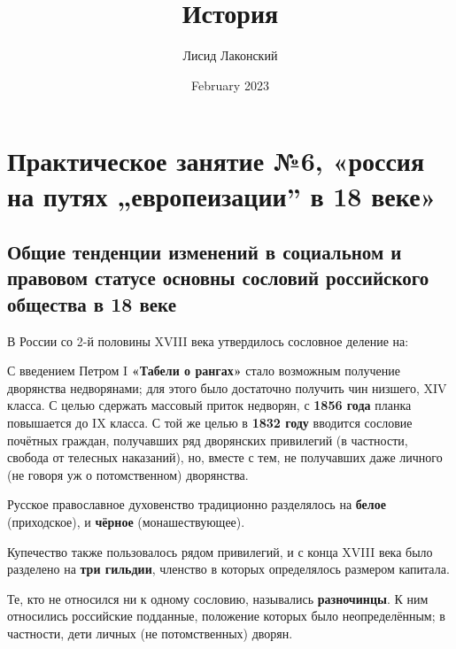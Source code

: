\documentclass{article}
\title{История}
\author{Лисид Лаконский}
\date{February 2023}
\begin{document}
\raggedright

\maketitle
\tableofcontents
\pagebreak

\section{Практическое занятие №6, «россия на путях „европеизации” в 18 веке»}

\subsection{Общие тенденции изменений в социальном и правовом статусе основны сословий российского общества в 18 веке}

В России со 2-й половины XVIII века утвердилось сословное деление на:

\begin{multienumerate}
\end{multienumerate}

С введением Петром I \textbf{«Табели о рангах»} стало возможным получение дворянства недворянами; для этого было достаточно получить чин низшего, XIV класса. С целью сдержать массовый приток недворян, с \textbf{1856 года} планка повышается до IX класса. С той же целью в \textbf{1832 году} вводится сословие почётных граждан, получавших ряд дворянских привилегий (в частности, свобода от телесных наказаний), но, вместе с тем, не получавших даже личного (не говоря уж о потомственном) дворянства.

Русское православное духовенство традиционно разделялось на \textbf{белое} (приходское), и \textbf{чёрное} (монашествующее).

Купечество также пользовалось рядом привилегий, и с конца XVIII века было разделено на \textbf{три гильдии}, членство в которых определялось размером капитала.

Те, кто не относился ни к одному сословию, назывались \textbf{разночинцы}. К ним относились российские подданные, положение которых было неопределённым; в частности, дети личных (не потомственных) дворян.
\end{document}
